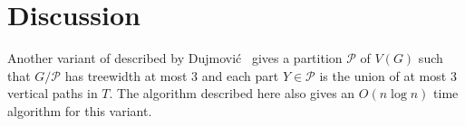 \documentclass[kpfonts]{patmorin}
\let\ge\geqslant
\begin{document}
%
%

\section{Discussion}


Another variant of  described by Dujmović \etal\ gives a partition $\mathcal{P}$ of $V(G)$ such that $G/\mathcal{P}$ has treewidth at most 3 and each part $Y\in\mathcal{P}$ is the union of at most 3 vertical paths in $T$.  The algorithm described here also gives an $O(n\log n)$ time algorithm for this variant.
\end{document}
